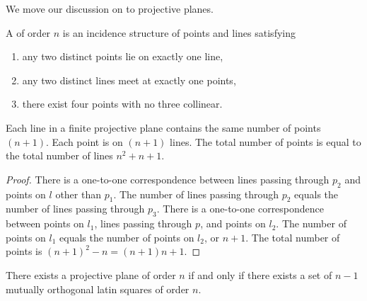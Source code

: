 We move our discussion on to projective planes.

\begin{definition}
    A  of order $n$ is an incidence structure of points and lines satisfying
    \begin{enumerate}
        \item any two distinct points lie on exactly one line,
        \item any two distinct lines meet at exactly one points,
        \item there exist four points with no three collinear.
    \end{enumerate}
\end{definition}

\begin{lemma}
    Each line in a finite projective plane contains the same number of points $(n+1)$. Each point is on $(n+1)$ lines. The total number of points is equal to the total number of lines $n^{2}+n+1$.
\end{lemma}
\begin{proof}
    There is a one-to-one correspondence between lines passing through $p_{2}$ and points on $l$ other than $p_{1}$. The number of lines passing through $p_{2}$ equals the number of lines passing through $p_{3}$. There is a one-to-one correspondence between points on $l_{1}$, lines passing through $p$, and points on $l_{2}$. The number of points on $l_{1}$ equals the number of points on $l_{2}$, or $n+1$. The total number of points is $(n+1)^{2}-n = (n+1)n + 1$.
\end{proof}

\begin{theorem}
    There exists a projective plane of order $n$ if and only if there exists a set of $n-1$ mutually orthogonal latin squares of order $n$.
\end{theorem}


